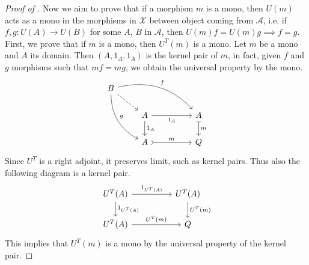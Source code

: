 \begin{subbox}{}
\begin{proof}[\textit{Proof of }]
    Now we aim to prove that if a morphism $m$ is a mono, then $U(m)$ acts as a mono in the morphisms in $\mathcal{X}$ between object coming from $\mathcal{A}$, i.e. if $f,g : U(A) \to U(B)$ for some $A$, $B$ in $\mathcal{A}$, then $U(m)f=U(m)g \implies f=g$. First, we prove that if $m$ is a mono, then $U^T(m)$ is a mono. Let $m$ be a mono and $A$ its domain. Then $(A, 1_A, 1_A)$ is the kernel pair of $m$, in fact, given $f$ and $g$ morphisms such that $mf=mg$, we obtain the universal property by the mono.
    \[
\begin{tikzcd}
B \arrow[rdd, "g", bend right] \arrow[rrrd, "f", bend left] \arrow[rd, dashed] &                                       &  &                        \\
                                                                               & A \arrow[d, "1_A"] \arrow[rr, "1_A"'] &  & A \arrow[d, "m", tail] \\
                                                                               & A \arrow[rr, "m", tail]               &  & Q                     
\end{tikzcd}
    \]
    Since $U^T$ is a right adjoint, it preserves limit, such as kernel pairs. Thus also the following diagram is a kernel pair.
    \[
\begin{tikzcd}
U^T(A) \arrow[d, "1_{U^T(A)}"] \arrow[rr, "1_{U^T(A)}"] &  & U^T(A) \arrow[d, "U^T(m)"] \\
U^T(A) \arrow[rr, "U^T(m)"]                               &  & Q                       
\end{tikzcd}
    \]
    This implies that $U^T(m)$ is a mono by the universal property of the kernel pair. 
    

\end{proof}
\end{subbox}
